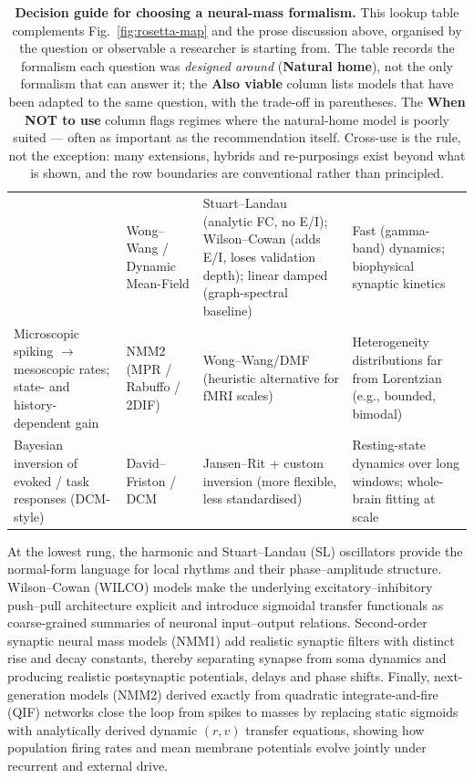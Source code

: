 \documentclass[12pt]{article}
\numberwithin{equation}{section}
\newcommand{\rev}[1]{\begingroup\color{navyblue}#1\endgroup}
\begin{document}
\begin{table}[!htbp]
\begin{tabularx}{\textwidth}{|p{3.2cm}|p{3.0cm}|Y|p{3.0cm}|}
  & Wong--Wang / Dynamic Mean-Field
  & Stuart--Landau (analytic FC, no E/I); Wilson--Cowan (adds E/I, loses validation depth); linear damped (graph-spectral baseline)
  & Fast (gamma-band) dynamics; biophysical synaptic kinetics \\[3pt]
Microscopic spiking $\to$ mesoscopic rates; state- and history-dependent gain
  & NMM2 (MPR / Rabuffo / 2DIF)
  & Wong--Wang/DMF (heuristic alternative for fMRI scales)
  & Heterogeneity distributions far from Lorentzian (e.g., bounded, bimodal) \\[3pt]
Bayesian inversion of evoked / task responses (DCM-style)
  & David--Friston / DCM
  & Jansen--Rit + custom inversion (more flexible, less standardised)
  & Resting-state dynamics over long windows; whole-brain fitting at scale \\
\hline
\end{tabularx}
\endgroup
\caption{\rev{\textbf{Decision guide for choosing a neural-mass formalism.} This lookup table complements Fig.~\ref{fig:rosetta-map} and the prose discussion above, organised by the question or observable a researcher is starting from. The table records the formalism each question was \emph{designed around} (\textbf{Natural home}), not the only formalism that can answer it; the \textbf{Also viable} column lists models that have been adapted to the same question, with the trade-off in parentheses. The \textbf{When NOT to use} column flags regimes where the natural-home model is poorly suited --- often as important as the recommendation itself. Cross-use is the rule, not the exception: many extensions, hybrids and re-purposings exist beyond what is shown, and the row boundaries are conventional rather than principled.}}
\label{tab:rosetta-guide}
\end{table}

At the lowest rung, the harmonic and Stuart–Landau (SL) oscillators provide the normal-form language for local rhythms and their phase–amplitude structure. Wilson–Cowan (WILCO) models make the underlying excitatory–inhibitory push–pull architecture explicit and introduce sigmoidal transfer functionals as coarse-grained summaries of neuronal input–output relations. Second-order synaptic neural mass models (NMM1) add realistic synaptic filters with distinct rise and decay constants, thereby separating synapse from soma dynamics and producing realistic postsynaptic potentials, delays and phase shifts. Finally, next-generation models (NMM2) derived exactly from quadratic integrate-and-fire (QIF) networks close the loop from spikes to masses by replacing static sigmoids with analytically derived dynamic $(r,v)$ transfer equations, showing how population firing rates and mean membrane potentials evolve jointly under recurrent and external drive.\cite{montbrioMacroscopicDescriptionNetworks2015,coombesNextGenerationNeural2019,byrneNextgenerationNeuralMass2020,clusellaComparisonExactHeuristic2023}
\end{document}
